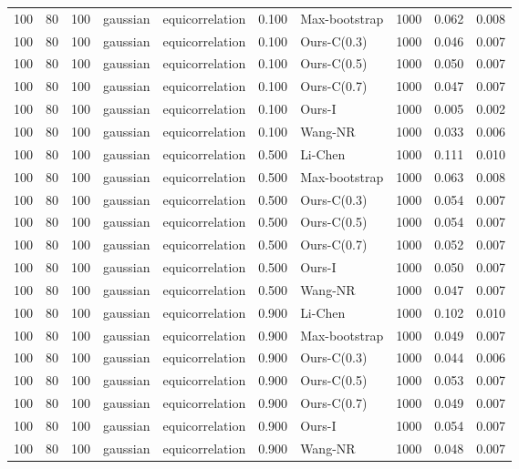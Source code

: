 \begin{tabular}{rrrllrlrrr}
100 & 80 & 100 & gaussian & equicorrelation & 0.100 & Max-bootstrap & 1000 & 0.062 & 0.008 \\
100 & 80 & 100 & gaussian & equicorrelation & 0.100 & Ours-C(0.3) & 1000 & 0.046 & 0.007 \\
100 & 80 & 100 & gaussian & equicorrelation & 0.100 & Ours-C(0.5) & 1000 & 0.050 & 0.007 \\
100 & 80 & 100 & gaussian & equicorrelation & 0.100 & Ours-C(0.7) & 1000 & 0.047 & 0.007 \\
100 & 80 & 100 & gaussian & equicorrelation & 0.100 & Ours-I & 1000 & 0.005 & 0.002 \\
100 & 80 & 100 & gaussian & equicorrelation & 0.100 & Wang-NR & 1000 & 0.033 & 0.006 \\
100 & 80 & 100 & gaussian & equicorrelation & 0.500 & Li-Chen & 1000 & 0.111 & 0.010 \\
100 & 80 & 100 & gaussian & equicorrelation & 0.500 & Max-bootstrap & 1000 & 0.063 & 0.008 \\
100 & 80 & 100 & gaussian & equicorrelation & 0.500 & Ours-C(0.3) & 1000 & 0.054 & 0.007 \\
100 & 80 & 100 & gaussian & equicorrelation & 0.500 & Ours-C(0.5) & 1000 & 0.054 & 0.007 \\
100 & 80 & 100 & gaussian & equicorrelation & 0.500 & Ours-C(0.7) & 1000 & 0.052 & 0.007 \\
100 & 80 & 100 & gaussian & equicorrelation & 0.500 & Ours-I & 1000 & 0.050 & 0.007 \\
100 & 80 & 100 & gaussian & equicorrelation & 0.500 & Wang-NR & 1000 & 0.047 & 0.007 \\
100 & 80 & 100 & gaussian & equicorrelation & 0.900 & Li-Chen & 1000 & 0.102 & 0.010 \\
100 & 80 & 100 & gaussian & equicorrelation & 0.900 & Max-bootstrap & 1000 & 0.049 & 0.007 \\
100 & 80 & 100 & gaussian & equicorrelation & 0.900 & Ours-C(0.3) & 1000 & 0.044 & 0.006 \\
100 & 80 & 100 & gaussian & equicorrelation & 0.900 & Ours-C(0.5) & 1000 & 0.053 & 0.007 \\
100 & 80 & 100 & gaussian & equicorrelation & 0.900 & Ours-C(0.7) & 1000 & 0.049 & 0.007 \\
100 & 80 & 100 & gaussian & equicorrelation & 0.900 & Ours-I & 1000 & 0.054 & 0.007 \\
100 & 80 & 100 & gaussian & equicorrelation & 0.900 & Wang-NR & 1000 & 0.048 & 0.007 \\

\end{tabular}
